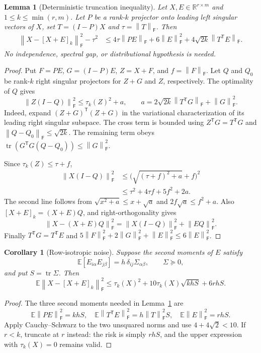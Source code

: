 \documentclass[11pt]{article}
\newtheorem{lemma}[theorem]{Lemma}
\newtheorem{corollary}[theorem]{Corollary}
\theoremstyle{remark}
\newcommand{\R}{\mathbb R}
\newcommand{\E}{\mathbb E}
\newcommand{\F}{\mathsf F}
\newcommand{\tr}{\operatorname{tr}}
\newcommand{\norm}[1]{\left\lVert #1\right\rVert}
\begin{document}
\begin{lemma}[Deterministic truncation inequality]\label{lem:truncation}
Let $X,E\in\R^{r\times m}$ and $1\le k\le\min(r,m)$. Let $P$ be a rank-$k$
projector onto leading left singular vectors of $X$, set $T=(I-P)X$ and
$\tau=\norm{T}_\F$. Then
\begin{align}\label{eq:truncation}
 \norm{X-[X+E]_k}_\F^2-\tau^2
 &\le 4\tau\norm{PE}_\F+6\norm{E}_\F^2
       +4\sqrt{2k}\norm{T^{\mathsf T}E}_\F.
\end{align}
No independence, spectral gap, or distributional hypothesis is needed.
\end{lemma}
\begin{proof}
Put $F=PE$, $G=(I-P)E$, $Z=X+F$, and $f=\norm{F}_\F$.
Let $Q$ and $Q_0$ be rank-$k$ right singular projectors for $Z+G$ and $Z$,
respectively. The optimality of $Q$ gives
\[
 \norm{Z(I-Q)}_\F^2\le \tau_k(Z)^2+a,
 \qquad
 a=2\sqrt{2k}\norm{T^{\mathsf T}G}_\F+\norm{G}_\F^2.
\]
Indeed, expand $(Z+G)^{\mathsf T}(Z+G)$ in the variational characterization of
its leading right singular subspace. The cross term is bounded using
$Z^{\mathsf T}G=T^{\mathsf T}G$ and
$\norm{Q-Q_0}_\F\le\sqrt{2k}$. The remaining term obeys
$\tr(G^{\mathsf T}G(Q-Q_0))\le\norm{G}_\F^2$.

Since $\tau_k(Z)\le\tau+f$,
\begin{align*}
 \norm{X(I-Q)}_\F^2
 &\le\bigl(\sqrt{(\tau+f)^2+a}+f\bigr)^2\\
 &\le\tau^2+4\tau f+5f^2+2a.
\end{align*}
The second line follows from $\sqrt{x^2+a}\le x+\sqrt a$ and
$2f\sqrt a\le f^2+a$. Also $[X+E]_k=(X+E)Q$, and right-orthogonality gives
\[
 \norm{X-(X+E)Q}_\F^2
 =\norm{X(I-Q)}_\F^2+\norm{EQ}_\F^2.
\]
Finally $T^{\mathsf T}G=T^{\mathsf T}E$ and
$5\norm{F}_\F^2+2\norm{G}_\F^2+\norm{E}_\F^2\le6\norm{E}_\F^2$.
\end{proof}

\begin{corollary}[Row-isotropic noise]\label{cor:isotropic}
Suppose the second moments of $E$ satisfy
\[
 \E[E_{i\alpha}E_{j\beta}]=h\,\delta_{ij}\Sigma_{\alpha\beta},
 \qquad \Sigma\succeq0,
\]
and put $S=\tr\Sigma$. Then
\begin{equation}\label{eq:isotropic}
 \E\norm{X-[X+E]_k}_\F^2
 \le \tau_k(X)^2+10\tau_k(X)\sqrt{khS}+6rhS.
\end{equation}
\end{corollary}
\begin{proof}
The three second moments needed in Lemma~\ref{lem:truncation} are
\[
 \E\norm{PE}_\F^2=khS,\quad
 \E\norm{T^{\mathsf T}E}_\F^2=h\norm{T}_\F^2S,\quad
 \E\norm{E}_\F^2=rhS.
\]
Apply Cauchy--Schwarz to the two unsquared norms and use
$4+4\sqrt2<10$. If $r<k$, truncate at $r$ instead: the risk is simply
$rhS$, and the upper expression with $\tau_k(X)=0$ remains valid.
\end{proof}
\end{document}
